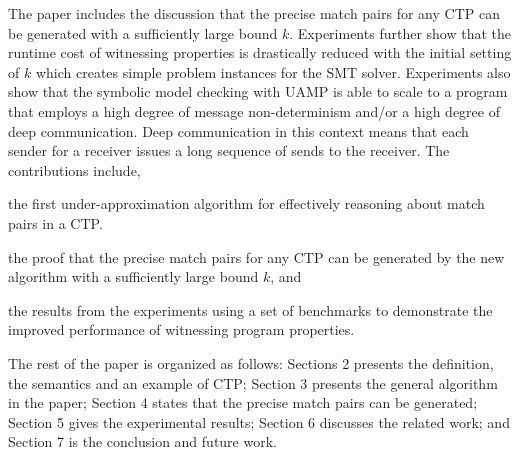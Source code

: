 The paper includes the discussion that the precise match pairs for any CTP can be generated with a sufficiently large bound $k$. 
Experiments further show that the runtime cost of witnessing properties is drastically reduced with the initial setting of $k$ which creates simple problem instances for the SMT solver. 
Experiments also show that the symbolic model checking with UAMP is able to scale to a program that employs a high degree of message non-determinism and/or a high degree of deep communication.
Deep communication in this context means that each sender for a receiver issues a long sequence of sends to the receiver.
The contributions include,
\begin{compactitem}
\item the first under-approximation algorithm for effectively reasoning about match pairs in a CTP.
\item the proof that the precise match pairs for any CTP can be generated by the new algorithm with a sufficiently large bound $k$, and
\item the results from the experiments using a set of benchmarks to demonstrate the improved performance of witnessing program properties.
\end{compactitem}

The rest of the paper is organized as follows: 
Sections 2 presents the definition, the semantics and an example of CTP; Section 3 presents the general algorithm in the paper; Section 4 states that the precise match pairs can be generated; Section 5 gives the experimental results; Section 6 discusses the related work; and Section 7 is the conclusion and future work.
